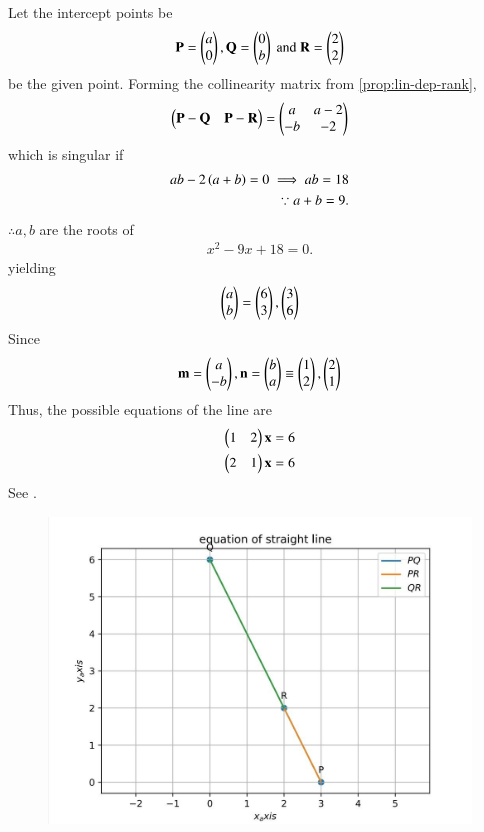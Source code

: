 Let  the intercept points be
\begin{align}
{\mathbf{P}}=\begin{pmatrix}
  a\\
  0\end{pmatrix}
 , {\mathbf{Q}}=\begin{pmatrix}
  0\\
  b\end{pmatrix}
  \text{ and }
   {\mathbf{R}}=\begin{pmatrix}
  2\\
  2\end{pmatrix}
\end{align}
be the given point.  
Forming the collinearity matrix from 
		\eqref{prop:lin-dep-rank},
\begin{align}
	\begin{pmatrix} \mathbf{P}-\mathbf{Q} &\mathbf{P}-\mathbf{R}\end{pmatrix} 
	=
	 \begin{pmatrix}
  a & a-2\\
  -b & -2
 \end{pmatrix}
\end{align}
which is singular if 
\begin{align}
 ab -2\left(a+b\right) = 0
 \implies ab = 18
		\label{eq:11/10/2/13-a+b}
		\\
\because  a + b = 9.
\end{align}
$\therefore a,b$
are the roots of
\begin{align}
	x^2 -9x +18 = 0.
\end{align}
yielding
\begin{align}
	\begin{pmatrix}a \\ b\end{pmatrix} = \begin{pmatrix}6 \\ 3\end{pmatrix}, \begin{pmatrix}3\\6\end{pmatrix}
\end{align}
Since 
\begin{align}
	\mathbf{m} = \begin{pmatrix}a \\ -b\end{pmatrix},
	\mathbf{n} = \begin{pmatrix}b \\ a\end{pmatrix} \equiv \begin{pmatrix}1 \\ 2\end{pmatrix}, \begin{pmatrix}2\\1\end{pmatrix}
\end{align}
Thus, the possible equations of the line are 
\begin{align}
\begin{pmatrix}1 & 2\end{pmatrix}\mathbf{x} = 6
	\\
	\begin{pmatrix}2&1\end{pmatrix}\mathbf{x} = 6
\end{align}
		See .
	\begin{figure}[!ht]
		\centering
 \includegraphics[width=\columnwidth]{chapters/11/10/2/13/figs/assign4.png}
		\caption{}
		\label{fig:11/10/2/13}
  	\end{figure}
